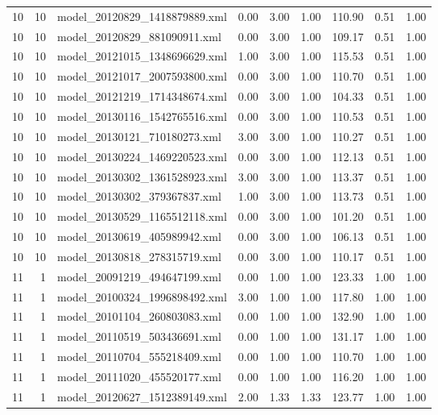 \begin{table}[ht]
\begin{tabular}{rrlrrrrrr}
   10 &  10 & model\_20120829\_1418879889.xml & 0.00 & 3.00 & 1.00 & 110.90 & 0.51 & 1.00 \\ 
   10 &  10 & model\_20120829\_881090911.xml & 0.00 & 3.00 & 1.00 & 109.17 & 0.51 & 1.00 \\ 
   10 &  10 & model\_20121015\_1348696629.xml & 1.00 & 3.00 & 1.00 & 115.53 & 0.51 & 1.00 \\ 
   10 &  10 & model\_20121017\_2007593800.xml & 0.00 & 3.00 & 1.00 & 110.70 & 0.51 & 1.00 \\ 
   10 &  10 & model\_20121219\_1714348674.xml & 0.00 & 3.00 & 1.00 & 104.33 & 0.51 & 1.00 \\ 
   10 &  10 & model\_20130116\_1542765516.xml & 0.00 & 3.00 & 1.00 & 110.53 & 0.51 & 1.00 \\ 
   10 &  10 & model\_20130121\_710180273.xml & 3.00 & 3.00 & 1.00 & 110.27 & 0.51 & 1.00 \\ 
   10 &  10 & model\_20130224\_1469220523.xml & 0.00 & 3.00 & 1.00 & 112.13 & 0.51 & 1.00 \\ 
   10 &  10 & model\_20130302\_1361528923.xml & 3.00 & 3.00 & 1.00 & 113.37 & 0.51 & 1.00 \\ 
   10 &  10 & model\_20130302\_379367837.xml & 1.00 & 3.00 & 1.00 & 113.73 & 0.51 & 1.00 \\ 
   10 &  10 & model\_20130529\_1165512118.xml & 0.00 & 3.00 & 1.00 & 101.20 & 0.51 & 1.00 \\ 
   10 &  10 & model\_20130619\_405989942.xml & 0.00 & 3.00 & 1.00 & 106.13 & 0.51 & 1.00 \\ 
   10 &  10 & model\_20130818\_278315719.xml & 0.00 & 3.00 & 1.00 & 110.17 & 0.51 & 1.00 \\ 
   11 &   1 & model\_20091219\_494647199.xml & 0.00 & 1.00 & 1.00 & 123.33 & 1.00 & 1.00 \\ 
   11 &   1 & model\_20100324\_1996898492.xml & 3.00 & 1.00 & 1.00 & 117.80 & 1.00 & 1.00 \\ 
   11 &   1 & model\_20101104\_260803083.xml & 0.00 & 1.00 & 1.00 & 132.90 & 1.00 & 1.00 \\ 
   11 &   1 & model\_20110519\_503436691.xml & 0.00 & 1.00 & 1.00 & 131.17 & 1.00 & 1.00 \\ 
   11 &   1 & model\_20110704\_555218409.xml & 0.00 & 1.00 & 1.00 & 110.70 & 1.00 & 1.00 \\ 
   11 &   1 & model\_20111020\_455520177.xml & 0.00 & 1.00 & 1.00 & 116.20 & 1.00 & 1.00 \\ 
   11 &   1 & model\_20120627\_1512389149.xml & 2.00 & 1.33 & 1.33 & 123.77 & 1.00 & 1.00 \\ 

\end{tabular}
\end{table}
